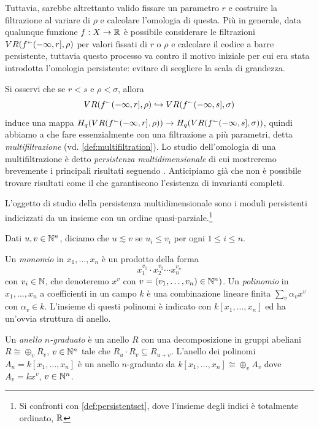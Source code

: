 Tuttavia, sarebbe altrettanto valido fissare un parametro $r$ e costruire la filtrazione al variare di $\rho$ e calcolare l'omologia di questa. Più in generale, data qualunque funzione $f:X\to \mathbb{R}$ è possibile considerare le filtrazioni $VR(f^\shortleftarrow(-\infty,r],\rho)$ per valori fissati di $r$ o $\rho$ e calcolare il codice a barre persistente, tuttavia questo processo va contro il motivo iniziale per cui era stata introdotta l'omologia persistente: evitare di scegliere la scala di grandezza.

Si osservi che se $r<s$ e $\rho<\sigma$, allora
\begin{equation*}
  VR(f^\shortleftarrow(-\infty,r],\rho)\hookrightarrow VR(f^\shortleftarrow(-\infty,s],\sigma)
\end{equation*}
induce
una mappa $H_q(VR(f^\shortleftarrow(-\infty,r],\rho))\to H_q(VR(f^\shortleftarrow(-\infty,s],\sigma))$, quindi abbiamo a che fare essenzialmente con una filtrazione a più parametri, detta \emph{multifiltrazione} (vd. \cref{def:multifiltration}). Lo studio dell'omologia di una multifiltrazione è detto \emph{persistenza multidimensionale} di cui mostreremo brevemente i principali risultati seguendo \cite{Carlsson2009a}.
Anticipiamo già che non è possibile trovare risultati come il  che garantiscono l'esistenza di invarianti completi.

\begin{sloppypar}
  L'oggetto di studio della persistenza multidimensionale sono i moduli persistenti indicizzati da un insieme con un ordine quasi-parziale.\footnote{Si confronti con \cref{def:persistentset}, dove l'insieme degli indici è totalmente ordinato, $\mathbb{R}$}
\end{sloppypar}

Dati $u,v\in\mathbb{N}^n$, diciamo che $u\lesssim v$ se $u_i \leq v_i$ per ogni $1\leq i\leq n$.

Un \emph{monomio} in $x_1,\dots,x_n$ è un prodotto della forma
\begin{equation*}
  x_1^{v_1}\cdot x_2^{v_2} \cdots x_n^{v_n}
\end{equation*}
con $v_i\in\mathbb{N}$, che denoteremo $x^v$ con $v=(v_1,\dots,v_n)\in\mathbb{N}^n)$. Un \emph{polinomio} in $x_1,\dots,x_n$ a coefficienti in un campo $k$ è una combinazione lineare finita $\sum_v \alpha_v x^v$ con $\alpha_v\in k$. L'insieme di questi polinomi è indicato con $k[x_1,\dots,x_n]$ ed ha un'ovvia struttura di anello.

Un \emph{anello $n$-graduato} è un anello $R$ con una decomposizione in gruppi abeliani $R\cong \oplus_v R_v$, $v\in\mathbb{N}^n$ tale che $R_u\cdot R_v\subseteq R_{u+v}$. L'anello dei polinomi $A_n = k[x_1,\dots,x_n]$ è un anello $n$-graduato da
$k[x_1,\dots,x_n]\cong \oplus_v A_v$ dove $A_v= kx^v$, $v\in\mathbb{N}^n$.

